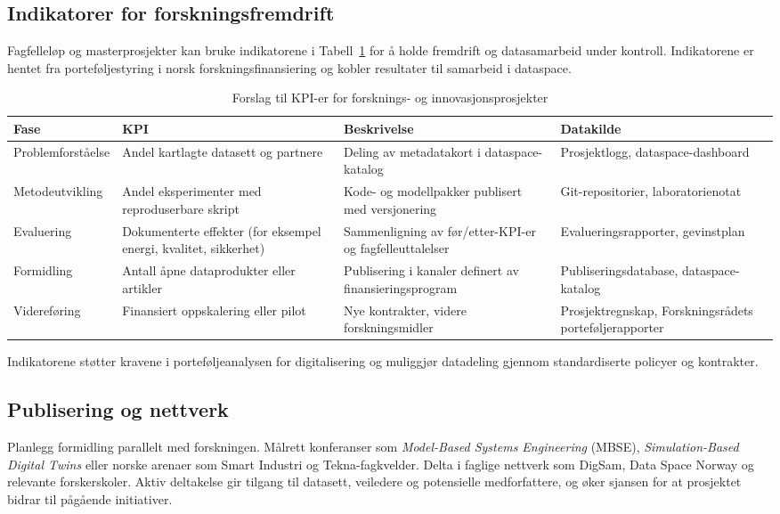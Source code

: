 \subsection*{Indikatorer for forskningsfremdrift}
Fagfelleløp og masterprosjekter kan bruke indikatorene i Tabell~\ref{tab:forskningsindikatorer} for å holde fremdrift og datasamarbeid under kontroll. Indikatorene er hentet fra porteføljestyring i norsk forskningsfinansiering og kobler resultater til samarbeid i dataspace.

\begin{table}[h]
    \centering
    \caption{Forslag til KPI-er for forsknings- og innovasjonsprosjekter}
    \label{tab:forskningsindikatorer}
    \begin{tabular}{p{2.6cm}p{3.8cm}p{3.8cm}p{3.2cm}}
        \toprule
        Fase & KPI & Beskrivelse & Datakilde \\
        \midrule
        Problemforståelse & Andel kartlagte datasett og partnere & Deling av metadatakort i dataspace-katalog & Prosjektlogg, dataspace-dashboard \\
        Metodeutvikling & Andel eksperimenter med reproduserbare skript & Kode- og modellpakker publisert med versjonering & Git-repositorier, laboratorienotat \\
        Evaluering & Dokumenterte effekter (for eksempel energi, kvalitet, sikkerhet) & Sammenligning av før/etter-KPI-er og fagfelleuttalelser & Evalueringsrapporter, gevinstplan \\
        Formidling & Antall åpne dataprodukter eller artikler & Publisering i kanaler definert av finansieringsprogram & Publiseringsdatabase, dataspace-katalog \\
        Videreføring & Finansiert oppskalering eller pilot & Nye kontrakter, videre forskningsmidler & Prosjektregnskap, Forskningsrådets porteføljerapporter \\
        \bottomrule
    \end{tabular}
\end{table}

Indikatorene støtter kravene i porteføljeanalysen for digitalisering og muliggjør datadeling gjennom standardiserte policyer og kontrakter.\citep{rcn2024digitalisering}

\subsection{Publisering og nettverk}
Planlegg formidling parallelt med forskningen. Målrett konferanser som \emph{Model-Based Systems Engineering} (MBSE), \emph{Simulation-Based Digital Twins} eller norske arenaer som Smart Industri og Tekna-fagkvelder. Delta i faglige nettverk som DigSam, Data Space Norway og relevante forskerskoler. Aktiv deltakelse gir tilgang til datasett, veiledere og potensielle medforfattere, og øker sjansen for at prosjektet bidrar til pågående initiativer.

